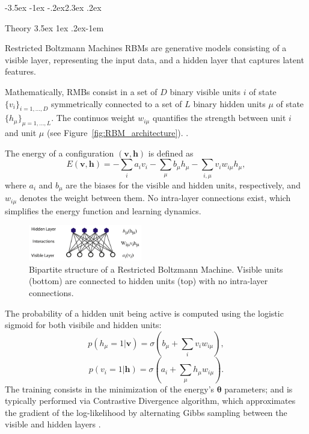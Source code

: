 \documentclass[prl,twocolumn]{revtex4-1}
\makeatletter
\renewcommand{\section}{\@startsection{section}{1}{\z@}%
    {-3.5ex \@plus -1ex \@minus -.2ex}{2.3ex \@plus.2ex}%
    {\normalfont\bfseries\raggedright}}
\renewcommand{\subsection}{\@startsection{subsection}{2}{\z@}%
    {3.5ex \@plus 1ex \@minus .2ex}{-1em}%
    {\normalfont\bfseries\raggedright}}
\makeatother
\begin{document}
\section{Theory}
\label{sec:theory}
\subsection{Restricted Boltzmann Machines}
RBMs are generative models consisting of a visible layer, representing the input data, and a hidden layer that captures latent features.

Mathematically, RMBs consist in a set of $D$ binary visible units $i$ of state $\{v_i\}_{i=1, ..., D}$ symmetrically connected to a set of $L$ binary hidden units $\mu$ of state $\{h_\mu\}_{\mu=1, ..., L}$. The continuos weight $w_{i\mu}$ quantifies the strength between unit $i$ and unit $\mu$ (see Figure~\ref{fig:RBM_architecture}). \cite{intro_ML,bortoletto}. 

The energy of a configuration $(\mathbf{v},\mathbf{h})$ is defined as
\begin{equation}
	E(\mathbf{v},\mathbf{h}) = -\sum_{i} a_i v_i - \sum_{\mu} b_\mu h_\mu - \sum_{i,\mu} v_i w_{i\mu} h_\mu,
\end{equation}
where $a_i$ and $b_\mu$ are the biases for the visible and hidden units, respectively, and $w_{i\mu}$ denotes the weight between them. No intra-layer connections exist, which simplifies the energy function and learning dynamics. 

\begin{figure}[!tb]
	\includegraphics[width=0.44\textwidth]{RBM_structure.png}
	\caption{Bipartite structure of a Restricted Boltzmann Machine. Visible units (bottom) are connected to hidden units (top) with no intra-layer connections.}
	\label{fig:rbm_model}
\end{figure}

The probability of a hidden unit being active is computed using the logistic sigmoid for both visibile and hidden units:
\begin{equation}
	p(h_\mu=1|\mathbf{v}) = \sigma\left(b_\mu+\sum_{i}v_iw_{i\mu}\right),
	\label{eq:p_of_h}
\end{equation}
\begin{equation}
	p(v_i=1|\mathbf{h}) = \sigma\left(a_i+\sum_{\mu}h_\mu w_{i\mu}\right).
	\label{eq:p_of_v}
\end{equation}
The training consists in the minimization of the energy's $\boldsymbol{\theta}$ parameters; and is typically performed via Contrastive Divergence algorithm, which approximates the gradient of the log-likelihood by alternating Gibbs sampling between the visible and hidden layers \cite{bortoletto,practical,intro_ML}.
\end{document}
